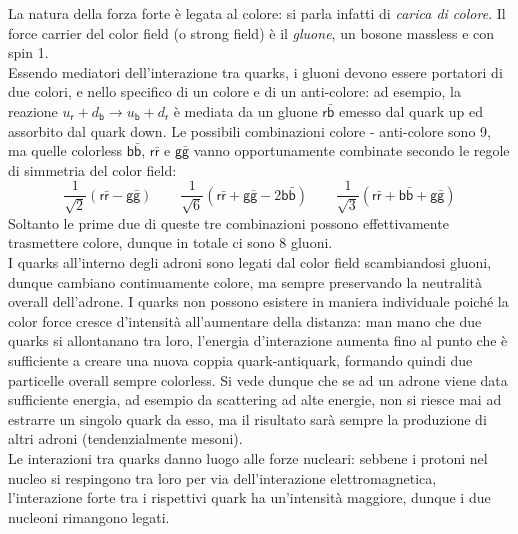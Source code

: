 La natura della forza forte è legata al colore: si parla infatti di \textit{carica di colore}. Il force carrier del color field (o strong field) è il \textit{gluone}, un bosone massless e con spin 1.\\
Essendo mediatori dell'interazione tra quarks, i gluoni devono essere portatori di due colori, e nello specifico di un colore e di un anti-colore: ad esempio, la reazione $ u_{\mathsf{r}} + d_{\mathsf{b}} \rightarrow u_{\mathsf{b}} + d_{\mathsf{r}} $ è mediata da un gluone $ \mathsf{r}\bar{\mathsf{b}} $ emesso dal quark up ed assorbito dal quark down. Le possibili combinazioni colore - anti-colore sono 9, ma quelle colorless $ \mathsf{b}\bar{\mathsf{b}} $, $ \mathsf{r}\bar{\mathsf{r}} $ e $ \mathsf{g}\bar{\mathsf{g}} $ vanno opportunamente combinate secondo le regole di simmetria del color field:
\begin{equation*}
	\frac{1}{\sqrt{2}} \left( \mathsf{r}\bar{\mathsf{r}} - \mathsf{g}\bar{\mathsf{g}} \right)
	\qquad
	\frac{1}{\sqrt{6}} \left( \mathsf{r}\bar{\mathsf{r}} + \mathsf{g}\bar{\mathsf{g}} - 2\mathsf{b}\bar{\mathsf{b}} \right)
	\qquad
	\frac{1}{\sqrt{3}} \left( \mathsf{r}\bar{\mathsf{r}} + \mathsf{b}\bar{\mathsf{b}} + \mathsf{g}\bar{\mathsf{g}} \right)
\end{equation*}
Soltanto le prime due di queste tre combinazioni possono effettivamente trasmettere colore, dunque in totale ci sono 8 gluoni.\\
I quarks all'interno degli adroni sono legati dal color field scambiandosi gluoni, dunque cambiano continuamente colore, ma sempre preservando la neutralità overall dell'adrone. I quarks non possono esistere in maniera individuale poiché la color force cresce d'intensità all'aumentare della distanza: man mano che due quarks si allontanano tra loro, l'energia d'interazione aumenta fino al punto che è sufficiente a creare una nuova coppia quark-antiquark, formando quindi due particelle overall sempre colorless. Si vede dunque che se ad un adrone viene data sufficiente energia, ad esempio da scattering ad alte energie, non si riesce mai ad estrarre un singolo quark da esso, ma il risultato sarà sempre la produzione di altri adroni (tendenzialmente mesoni).\\
Le interazioni tra quarks danno luogo alle forze nucleari: sebbene i protoni nel nucleo si respingono tra loro per via dell'interazione elettromagnetica, l'interazione forte tra i rispettivi quark ha un'intensità maggiore, dunque i due nucleoni rimangono legati.










